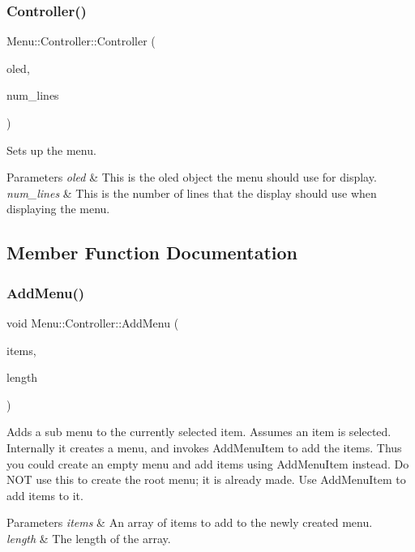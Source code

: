 \subsubsection{\texorpdfstring{Controller()}{Controller()}}
{\footnotesize\ttfamily Menu\+::\+Controller\+::\+Controller (\begin{DoxyParamCaption}\item[{\hyperlink{class_o_l_e_d}{O\+L\+ED} \&}]{oled,  }\item[{uint8\+\_\+t}]{num\+\_\+lines }\end{DoxyParamCaption})}

Sets up the menu. 
\begin{DoxyParams}{Parameters}
{\em oled} & This is the oled object the menu should use for display. \\
\hline
{\em num\+\_\+lines} & This is the number of lines that the display should use when displaying the menu. \\
\hline
\end{DoxyParams}


\subsection{Member Function Documentation}
\hypertarget{class_menu_1_1_controller_a49696644ab887bb0e3c4d272b914d2a2}{}\label{class_menu_1_1_controller_a49696644ab887bb0e3c4d272b914d2a2} 
\subsubsection{\texorpdfstring{Add\+Menu()}{AddMenu()}}
{\footnotesize\ttfamily void Menu\+::\+Controller\+::\+Add\+Menu (\begin{DoxyParamCaption}\item[{\hyperlink{struct_menu_1_1_item}{Item} $\ast$}]{items,  }\item[{uint8\+\_\+t}]{length }\end{DoxyParamCaption})}

Adds a sub menu to the currently selected item. Assumes an item is selected. Internally it creates a menu, and invokes Add\+Menu\+Item to add the items. Thus you could create an empty menu and add items using Add\+Menu\+Item instead. Do N\+OT use this to create the root menu; it is already made. Use Add\+Menu\+Item to add items to it. 
\begin{DoxyParams}{Parameters}
{\em items} & An array of items to add to the newly created menu. \\
\hline
{\em length} & The length of the array. \\
\hline
\end{DoxyParams}
\hypertarget{class_menu_1_1_controller_af93dbfeff28602f68705ade90f0757fc}{}\label{class_menu_1_1_controller_af93dbfeff28602f68705ade90f0757fc} 
